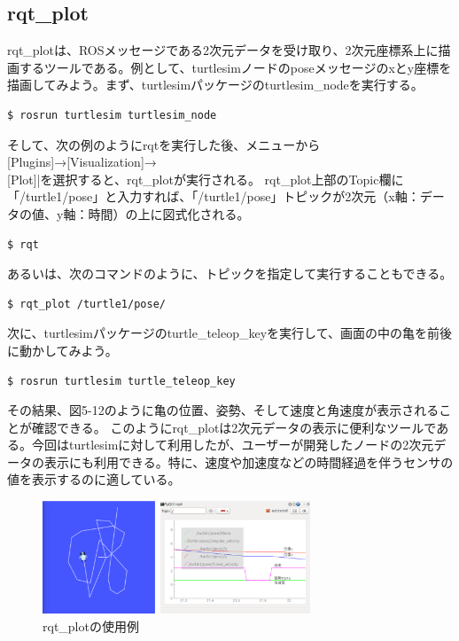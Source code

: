 \subsection{rqt\_plot}

rqt\_plotは、ROSメッセージである2次元データを受け取り、2次元座標系上に描画するツールである。例として、turtlesimノードのposeメッセージのxとy座標を描画してみよう。まず、turtlesimパッケージのturtlesim\_nodeを実行する。

\begin{lstlisting}[language=ROS]
$ rosrun turtlesim turtlesim_node
\end{lstlisting}

そして、次の例のようにrqtを実行した後、メニューから[Plugins]→[Visualization]→\\{[Plot]|}を選択すると、rqt\_plotが実行される。 rqt\_plot上部のTopic欄に「/turtle1/pose」と入力すれば、「/turtle1/pose」トピックが2次元（x軸：データの値、y軸：時間）の上に図式化される。

\begin{lstlisting}[language=ROS]
$ rqt
\end{lstlisting}

あるいは、次のコマンドのように、トピックを指定して実行することもできる。

\begin{lstlisting}[language=ROS]
$ rqt_plot /turtle1/pose/
\end{lstlisting}

次に、turtlesimパッケージのturtle\_teleop\_keyを実行して、画面の中の亀を前後に動かしてみよう。

\begin{lstlisting}[language=ROS]
$ rosrun turtlesim turtle_teleop_key
\end{lstlisting}

その結果、図5-12のように亀の位置、姿勢、そして速度と角速度が表示されることが確認できる。
このようにrqt\_plotは2次元データの表示に便利なツールである。今回はturtlesimに対して利用したが、ユーザーが開発したノードの2次元データの表示にも利用できる。特に、速度や加速度などの時間経過を伴うセンサの値を表示するのに適している。

\begin{figure}[h]
  \centering
  \includegraphics[width=8cm]{pictures/chapter5/pic_05_12.png}
  \caption{rqt\_plotの使用例}
\end{figure}

